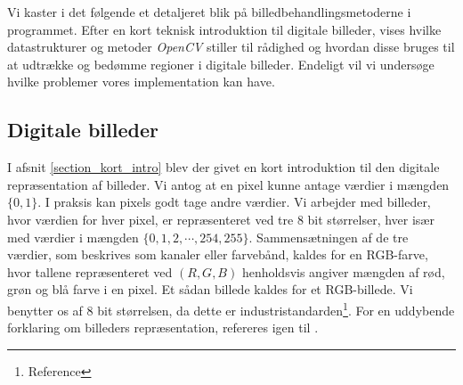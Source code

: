 {
{\sffamily Vi kaster i det følgende et detaljeret blik på
billedbehandlingsmetoderne i programmet. Efter en kort teknisk
introduktion til digitale billeder, vises hvilke datastrukturer og
metoder \emph{OpenCV} stiller til rådighed og hvordan disse bruges til
at udtrække og bedømme regioner i digitale billeder. Endeligt vil vi
undersøge hvilke problemer vores implementation kan have.
}

\subsection{Digitale billeder}
I afsnit \ref{section_kort_intro} blev der givet en kort introduktion
til den digitale repræsentation af billeder. Vi antog at en pixel kunne
antage værdier i mængden $\{0, 1\}$. I praksis kan pixels godt tage
andre værdier. Vi arbejder med billeder, hvor værdien for hver pixel, er
repræsenteret ved tre 8 bit størrelser, hver især med værdier i mængden
$\{0, 1, 2, \cdots, 254, 255\}$. Sammensætningen af de tre værdier, som
beskrives som kanaler eller farvebånd, kaldes for en RGB-farve, hvor
tallene repræsenteret ved $(R,G,B)$ henholdsvis angiver mængden af rød,
grøn og blå farve i en pixel. Et sådan billede kaldes for et
RGB-billede.  Vi benytter os af 8 bit størrelsen, da dette er
industristandarden\footnote{Reference}. For en uddybende forklaring om
billeders repræsentation, refereres igen til \cite{SIOlsen}.

}
